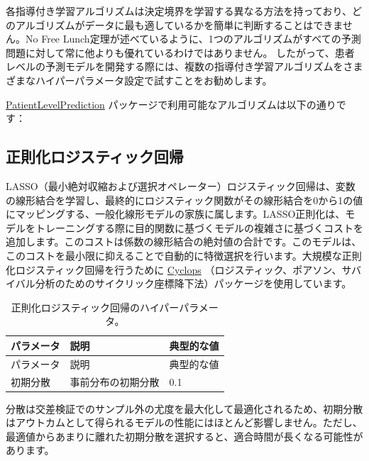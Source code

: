\documentclass[
  11pt]{book}
\theoremstyle{definition}
\theoremstyle{definition}
\theoremstyle{definition}
\theoremstyle{definition}
\theoremstyle{remark}
\begin{document}
各指導付き学習アルゴリズムは決定境界を学習する異なる方法を持っており、どのアルゴリズムがデータに最も適しているかを簡単に判断することはできません。No Free Lunch定理が述べているように、1つのアルゴリズムがすべての予測問題に対して常に他よりも優れているわけではありません。 したがって、患者レベルの予測モデルを開発する際には、複数の指導付き学習アルゴリズムをさまざまなハイパーパラメータ設定で試すことをお勧めします。

\href{https://ohdsi.github.io/PatientLevelPrediction/}{PatientLevelPrediction} パッケージで利用可能なアルゴリズムは以下の通りです：

\subsection{正則化ロジスティック回帰}\label{ux6b63ux5247ux5316ux30edux30b8ux30b9ux30c6ux30a3ux30c3ux30afux56deux5e30}

LASSO（最小絶対収縮および選択オペレーター）ロジスティック回帰は、変数の線形結合を学習し、最終的にロジスティック関数がその線形結合を0から1の値にマッピングする、一般化線形モデルの家族に属します。LASSO正則化は、モデルをトレーニングする際に目的関数に基づくモデルの複雑さに基づくコストを追加します。このコストは係数の線形結合の絶対値の合計です。このモデルは、このコストを最小限に抑えることで自動的に特徴選択を行います。大規模な正則化ロジスティック回帰を行うために \href{https://ohdsi.github.io/Cyclops/}{Cyclops} （ロジスティック、ポアソン、サバイバル分析のためのサイクリック座標降下法）パッケージを使用しています。    

\begin{longtable}[]{@{}lll@{}}
\caption{\label{tab:lassoParameters} 正則化ロジスティック回帰のハイパーパラメータ。}\tabularnewline
\toprule\noalign{}
パラメータ & 説明 & 典型的な値 \\
\midrule\noalign{}
\endfirsthead
\toprule\noalign{}
パラメータ & 説明 & 典型的な値 \\
\midrule\noalign{}
\endhead
\bottomrule\noalign{}
\endlastfoot
初期分散 & 事前分布の初期分散 & 0.1 \\
\end{longtable}

分散は交差検証でのサンプル外の尤度を最大化して最適化されるため、初期分散はアウトカムとして得られるモデルの性能にはほとんど影響しません。ただし、最適値からあまりに離れた初期分散を選択すると、適合時間が長くなる可能性があります。  
\end{document}

